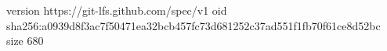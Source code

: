 version https://git-lfs.github.com/spec/v1
oid sha256:a0939d8f3ac7f50471ea32bcb457fc73d681252c37ad551f1fb70f61ce8d52bc
size 680

